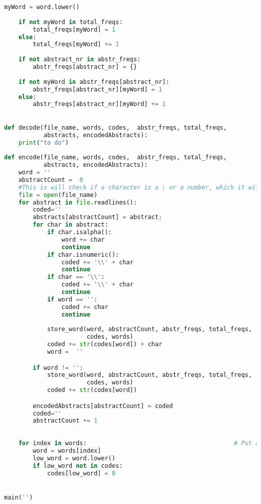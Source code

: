 \documentclass{article}
\begin{document}
\begin{lstlisting}[language=Python]
    myWord = word.lower()                                   
    
    if not myWord in total_freqs:
        total_freqs[myWord] = 1
    else:
        total_freqs[myWord] += 1
    
    if not abstract_nr in abstr_freqs:
        abstr_freqs[abstract_nr] = {}
    
    if not myWord in abstr_freqs[abstract_nr]:
        abstr_freqs[abstract_nr][myWord] = 1
    else:
        abstr_freqs[abstract_nr][myWord] += 1

        
def decode(file_name, words, codes,  abstr_freqs, total_freqs,
           abstracts, encodedAbstracts):
    print("to do")
        
def encode(file_name, words, codes,  abstr_freqs, total_freqs,
           abstracts, encodedAbstracts):
    word = ''
    abstractCount =  0 
    #This is will check if a character is a \ or a number, which it will have to encode in a different way
    file = open(file_name)
    for abstract in file.readlines():
        coded=''
        abstracts[abstractCount] = abstract;
        for char in abstract:
            if char.isalpha():
                word += char
                continue
            if char.isnumeric():
                coded += '\\' + char
                continue
            if char == '\\':
                coded += '\\' + char
                continue
            if word == '':
                coded += char
                continue
            
            store_word(word, abstractCount, abstr_freqs, total_freqs,
                       codes, words)
            coded += str(codes[word]) + char
            word =  ''

        if word != '': 
            store_word(word, abstractCount, abstr_freqs, total_freqs,
                       codes, words)
            coded += str(codes[word])

        encodedAbstracts[abstractCount] = coded
        coded=''
        abstractCount += 1
    
   
    for index in words:                                         # Put all cap words without lowercase in codes with code 0
        word = words[index]
        low_word = word.lower()
        if low_word not in codes:
            codes[low_word] = 0


main('')

\end{lstlisting}
\end{document}
